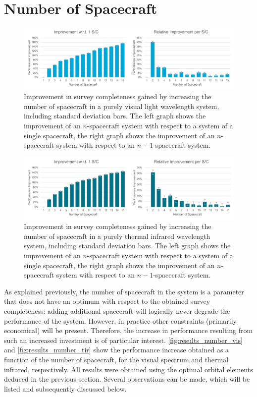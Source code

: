\section{Number of Spacecraft}
\label{sec:results_number}

\begin{figure}[htbp]
 \centering
 \includegraphics[width=1.0\textwidth]{img/number_sc_vis.pdf}
 \caption{Improvement in survey completeness gained by increasing the number of spacecraft in a purely visual light wavelength system, including standard deviation bars. The left graph shows the improvement of an $n$-spacecraft system with respect to a system of a single spacecraft, the right graph shows the improvement of an $n$-spacecraft system with respect to an $n-1$-spacecraft system.}
 \label{fig:results_number_vis}
\end{figure}


\begin{figure}[htbp]
 \centering
 \includegraphics[width=1.0\textwidth]{img/number_sc_tir.pdf}
 \caption{Improvement in survey completeness gained by increasing the number of spacecraft in a purely thermal infrared wavelength system, including standard deviation bars. The left graph shows the improvement of an $n$-spacecraft system with respect to a system of a single spacecraft, the right graph shows the improvement of an $n$-spacecraft system with respect to an $n-1$-spacecraft system.}
 \label{fig:results_number_tir}
\end{figure}

As explained previously, the number of spacecraft in the system is a parameter that does not have an optimum with respect to the obtained survey completeness: adding additional spacecraft will logically never degrade the performance of the system. However, in practice other constraints (primarily economical) will be present. Therefore, the increase in performance resulting from such an increased investment is of particular interest. \autoref{fig:results_number_vis} and \autoref{fig:results_number_tir} show the performance increase obtained as a function of the number of spacecraft, for the visual spectrum and thermal infrared, respectively. All results were obtained using the optimal orbital elements deduced in the previous section. Several observations can be made, which will be listed and subsequently discussed below.\\

